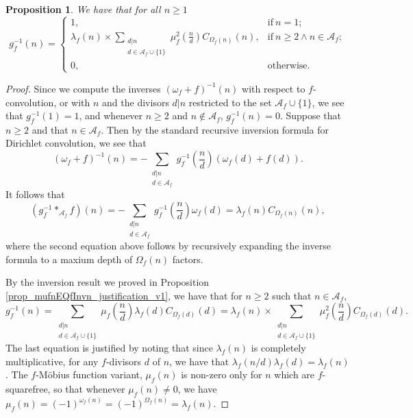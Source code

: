 \documentclass[11pt,reqno,a4letter]{article}
\numberwithin{figure}{section}
\numberwithin{table}{section}
\theoremstyle{plain}
\newtheorem{prop}[theorem]{Proposition}
\numberwithin{theorem}{section}
\theoremstyle{definition}
\begin{document}
\begin{prop}
We have that for all $n \geq 1$ 
\[
g_f^{-1}(n) = \begin{cases}
     1, & \mathrm{if\ } n = 1; \\ 
     \lambda_f(n) \times \sum\limits_{\substack{d|n \\ d \in \mathcal{A}_f \cup \{1\}}} 
     \mu_f^2\left(\frac{n}{d}\right) C_{\Omega_f(n)}(n), & \mathrm{if\ } n \geq 2 \wedge n \in \mathcal{A}_f; \\ 
     0, & \mathrm{otherwise.}
     \end{cases}
\]
\end{prop}
\begin{proof}
Since we compute the inverses $(\omega_f+f)^{-1}(n)$ with respect to $f$-convolution, 
or with $n$ and the divisors $d|n$ restricted to the set $\mathcal{A}_f \cup \{1\}$, 
we see that $g_f^{-1}(1) = 1$, and whenever $n \geq 2$ and $n \notin \mathcal{A}_f$, 
$g_f^{-1}(n) = 0$. 
Suppose that $n \geq 2$ and that $n \in \mathcal{A}_f$. 
Then by the standard recursive inversion formula for Dirichlet convolution, 
we see that 
\[
(\omega_f+f)^{-1}(n) = - \sum_{\substack{d|n \\ d \in \mathcal{A}_f}} g_f^{-1}\left(\frac{n}{d}\right) 
     (\omega_f(d) + f(d)). 
\]
It follows that 
\[
(g_f^{-1} \ast_{\mathcal{A}_f} f)(n) = -\sum_{\substack{d|n \\ d \in \mathcal{A}_f}} 
     g_f^{-1}\left(\frac{n}{d}\right) \omega_f(d) = 
     \lambda_f(n) C_{\Omega_f(n)}(n), 
\]
where the second equation above follows by recursively expanding the inverse 
formula to a maxium depth of $\Omega_f(n)$ factors. 

By the inversion result we proved in 
Proposition \ref{prop_mufnEQfInvn_justification_v1}, 
we have that for $n \geq 2$ such that $n \in \mathcal{A}_f$, 
\[
g_f^{-1}(n) = \sum_{\substack{d|n \\ d \in \mathcal{A}_f \cup \{1\}}} 
     \mu_f\left(\frac{n}{d}\right) \lambda_f(d) C_{\Omega_f(d)}(d) = 
     \lambda_f(n) \times \sum_{\substack{d|n \\ d \in \mathcal{A}_f \cup \{1\}}} 
     \mu_f^2\left(\frac{n}{d}\right) C_{\Omega_f(d)}(d). 
\]
The last equation is justified by noting that since $\lambda_f(n)$ is completely multiplicative, 
for any $f$-divisors $d$ of $n$, we have that $\lambda_f(n/d) \lambda_f(d) = \lambda_f(n)$. 
The $f$-M\"obius function variant, $\mu_f(n)$ is non-zero only for $n$ which are $f$-squarefree, so 
that whenever $\mu_f(n) \neq 0$, we have 
$\mu_f(n) = (-1)^{\omega_f(n)} = (-1)^{\Omega_f(n)} = \lambda_f(n)$. 
\end{proof}
\end{document}
